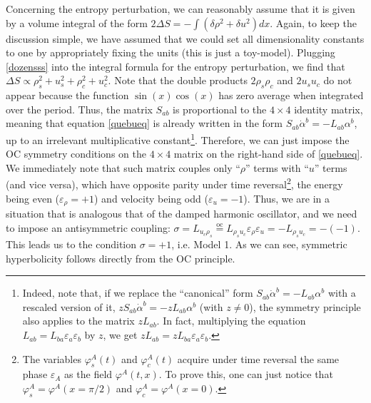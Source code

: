 \documentclass[a4paper, amsfonts, amssymb, amsmath, reprint, showkeys, nofootinbib, twoside, onecolumn,notitlepage]{revtex4-1}
\begin{document}
Concerning the entropy perturbation, we can reasonably assume that it is given by a volume integral of the form $2\Delta S=-\int (\delta \rho^2 +\delta u^2)dx$. Again, to keep the discussion simple, we have assumed that we could set all dimensionality constants to one by appropriately fixing the units (this is just a toy-model). Plugging \eqref{dozensss} into the integral formula for the entropy perturbation, we find that $\Delta S \propto \rho_s^2+u_s^2+\rho_c^2+u_c^2$. Note that the double products $2\rho_s \rho_c$ and $2u_s u_c$ do not appear because the function $\sin(x)\cos(x)$ has zero average when integrated over the period. Thus, the matrix $S_{ab}$ is proportional to the $4 \times 4$ identity matrix, meaning that equation \eqref{quebueq} is already written in the form $S_{ab} \dot{\alpha}^b =-L_{ab} \alpha^b$, up to an irrelevant multiplicative constant\footnote{Indeed, note that, if we replace the ``canonical'' form $S_{ab} \dot{\alpha}^b =-L_{ab} \alpha^b$ with a rescaled version of it, $zS_{ab} \dot{\alpha}^b =-zL_{ab} \alpha^b$ (with $z\neq 0$), the symmetry principle also applies to the matrix $zL_{ab}$. In fact, multiplying the equation $L_{ab}=L_{ba} \varepsilon_a \varepsilon_b $ by $z$, we get $zL_{ab}=zL_{ba} \varepsilon_a \varepsilon_b$.}. Therefore, we can just impose the OC symmetry conditions on the $4 \times 4$ matrix on the right-hand side of \eqref{quebueq}. We immediately note that such matrix couples only ``$\rho$'' terms with ``$u$'' terms (and vice versa), which have opposite parity under time reversal\footnote{The variables $\varphi^A_s(t)$ and $\varphi^A_c(t)$ acquire under time reversal the same phase $\varepsilon_A$ as the field $\varphi^A(t,x)$. To prove this, one can just notice that $\varphi^A_s=\varphi^A(x=\pi/2)$ and $\varphi^A_c=\varphi^A(x=0)$.}, the energy being even ($\varepsilon_\rho=+1$) and velocity being odd ($\varepsilon_u=-1$). Thus, we are in a situation that is analogous that of the damped harmonic oscillator, and we need to impose an antisymmetric coupling: $\sigma {=}L_{u_c \rho_s}\overset{\text{oc}}{=} L_{\rho_s u_c}\varepsilon_\rho \varepsilon_u{=}-L_{\rho_s u_c}{=}-(-1)$. This leads us to the condition $\sigma=+1$, i.e. Model 1. As we can see, symmetric hyperbolicity follows directly from the OC principle.
\end{document}
